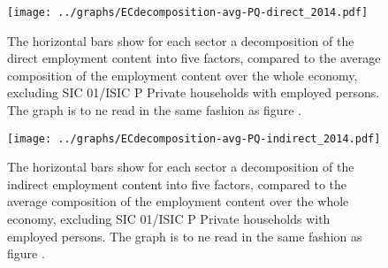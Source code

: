 \documentclass[12pt,english]{article}
\begin{document}
\begin{figure}[!ht]
	\centering
	\texttt{[image: ../graphs/ECdecomposition-avg-PQ-direct\_2014.pdf]}
	\caption{\footnotesize \label{Decomposition_PQ_direct}The horizontal bars show for each sector a decomposition of the direct employment content into five factors, compared to the average composition of the employment content over the whole economy, excluding SIC 01/ISIC P Private households with employed persons. The graph is to ne read in the same fashion as figure \label{Decomposition_PQ}. %
	}
\end{figure}	

\begin{figure}[!ht]
	\centering
	\texttt{[image: ../graphs/ECdecomposition-avg-PQ-indirect\_2014.pdf]}
	\caption{\footnotesize \label{Decomposition_PQ_indirect}The horizontal bars show for each sector a decomposition of the indirect employment content into five factors, compared to the average composition of the employment content over the whole economy, excluding SIC 01/ISIC P Private households with employed persons. The graph is to ne read in the same fashion as figure \label{Decomposition_PQ}. %
	}
\end{figure}
\end{document}
